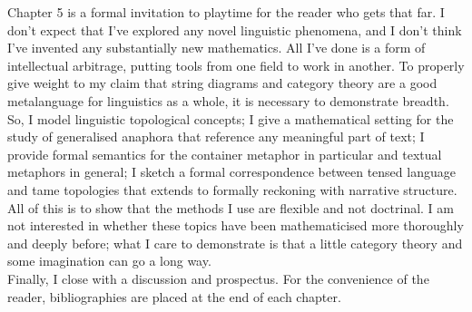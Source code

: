 Chapter 5 is a formal invitation to playtime for the reader who gets that far. I don't expect that I've explored any novel linguistic phenomena, and I don't think I've invented any substantially new mathematics. All I've done is a form of intellectual arbitrage, putting tools from one field to work in another. To properly give weight to my claim that string diagrams and category theory are a good metalanguage for linguistics as a whole, it is necessary to demonstrate breadth. So, I model linguistic topological concepts; I give a mathematical setting for the study of generalised anaphora that reference any meaningful part of text; I provide formal semantics for the container metaphor in particular and textual metaphors in general; I sketch a formal correspondence between tensed language and tame topologies that extends to formally reckoning with narrative structure. All of this is to show that the methods I use are flexible and not doctrinal. I am not interested in whether these topics have been mathematicised more thoroughly and deeply before; what I care to demonstrate is that a little category theory and some imagination can go a long way.\\

Finally, I close with a discussion and prospectus. For the convenience of the reader, bibliographies are placed at the end of each chapter. 